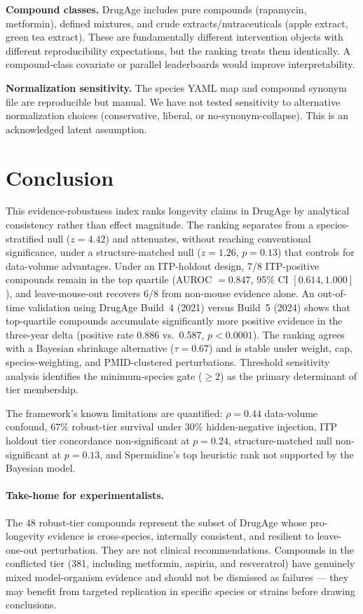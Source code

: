 \documentclass[11pt]{article}
\begin{document}
\textbf{Compound classes.} DrugAge includes pure compounds (rapamycin, metformin), defined mixtures, and crude extracts/nutraceuticals (apple extract, green tea extract). These are fundamentally different intervention objects with different reproducibility expectations, but the ranking treats them identically. A compound-class covariate or parallel leaderboards would improve interpretability.

\textbf{Normalization sensitivity.} The species YAML map and compound synonym file are reproducible but manual. We have not tested sensitivity to alternative normalization choices (conservative, liberal, or no-synonym-collapse). This is an acknowledged latent assumption.

\section{Conclusion}
This evidence-robustness index ranks longevity claims in DrugAge by analytical consistency rather than effect magnitude. The ranking separates from a species-stratified null ($z = 4.42$) and attenuates, without reaching conventional significance, under a structure-matched null ($z = 1.26$, $p = 0.13$) that controls for data-volume advantages. Under an ITP-holdout design, 7/8 ITP-positive compounds remain in the top quartile (AUROC $= 0.847$, 95\% CI $[0.614, 1.000]$), and leave-mouse-out recovers 6/8 from non-mouse evidence alone. An out-of-time validation using DrugAge Build~4 (2021) versus Build~5 (2024) shows that top-quartile compounds accumulate significantly more positive evidence in the three-year delta (positive rate 0.886 vs.\ 0.587, $p < 0.0001$). The ranking agrees with a Bayesian shrinkage alternative ($\tau = 0.67$) and is stable under weight, cap, species-weighting, and PMID-clustered perturbations. Threshold sensitivity analysis identifies the minimum-species gate ($\geq 2$) as the primary determinant of tier membership.

The framework's known limitations are quantified: $\rho = 0.44$ data-volume confound, 67\% robust-tier survival under 30\% hidden-negative injection, ITP holdout tier concordance non-significant at $p = 0.24$, structure-matched null non-significant at $p = 0.13$, and Spermidine's top heuristic rank not supported by the Bayesian model.

\paragraph{Take-home for experimentalists.} The 48 robust-tier compounds represent the subset of DrugAge whose pro-longevity evidence is cross-species, internally consistent, and resilient to leave-one-out perturbation. They are not clinical recommendations. Compounds in the conflicted tier (381, including metformin, aspirin, and resveratrol) have genuinely mixed model-organism evidence and should not be dismissed as failures --- they may benefit from targeted replication in specific species or strains before drawing conclusions.
\end{document}
